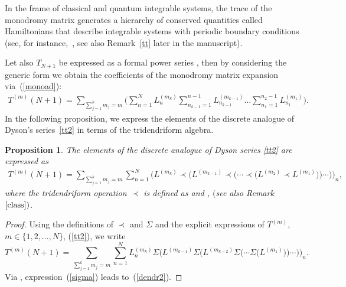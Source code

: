 \documentclass[pdftex]{sigma}
\numberwithin{equation}{section}
\newtheorem{pro}[thm]{Proposition}
\theoremstyle{definition}
\DeclareMathOperator{\EEnd}{End}%
\begin{document}
In the frame of classical and quantum integrable systems, the trace of the monodromy matrix generates a hierarchy of conserved quantities called Hamiltonians that describe integrable systems with periodic boundary conditions (see, for instance,~\cite{FT, FadTakRes}, see also Remark~\ref{tt} later in the manuscript).

Let also $T_{N+1}$ be expressed as a formal power series , then by considering the generic form  we obtain the coefficients of the monodromy matrix expansion via~(\ref{monoad}):
\begin{gather}
T^{(m)}(N+1)= \sum_{\sum_{j=1}^km_j=m}\Biggl(\sum_{n=1}^N L_n^{(m_k)} \sum_{n_{k-1}=1}^{n-1 }L^{(m_{k-1})}_{n_{k-1}} \dots \sum_{n_{1}=1}^{n_2-1 }L^{(m_1)}_{n_1}\Biggr). \label{tt2}
\end{gather}
In the following proposition, we express the elements of the discrete analogue of
Dyson's series~\eqref{tt2} in terms of the tridendriform algebra.

\begin{pro}
{\label{lemma01}} The elements of the discrete analogue of Dyson series
\eqref{tt2} are expressed as
\begin{gather}
T^{(m)}(N+1) = \sum_{\sum_{j=1}^km_j=m}\sum_{n=1}^N \bigl(L^{(m_k)}\prec \bigl(L^{(m_{k-1})} \prec \bigl( \cdots \prec\bigl( L^{(m_2)}\prec L^{(m_1)}\bigr)\bigr)\cdots \bigr) \bigr)_n , \label{dendr2}
\end{gather}
where the tridendriform operation $\prec$ is defined as  and , \smash{$a,b \in \EEnd\bigl({\mathbb C}^{\mathcal N}\bigr) \otimes {\mathfrak A}$} $($see also Remark~$\ref{class})$.
\end{pro}
\begin{proof}
Using the definitions of $\prec$ and $\Sigma$ and the explicit expressions of $T^{(m)}$, $m \in \{1,2, \dots, N\}$, (\ref{tt2}), we write
\begin{equation}
T^{(m)}(N+1) =\sum_{\sum_{j=1}^km_j=m} \sum_{n=1}^N L^{(m_k)}_n \Sigma\bigl(L^{(m_{k-1})}\Sigma\bigl(L^{(m_{k-2})}\Sigma\bigl(\cdots \Sigma\bigl(L^{(m_1)}\bigr)\bigr)\cdots \bigr)\bigr)_n. \label{sigma}
\end{equation}
Via , expression~(\ref{sigma}) leads to~(\ref{dendr2}).
\end{proof}
\end{document}
